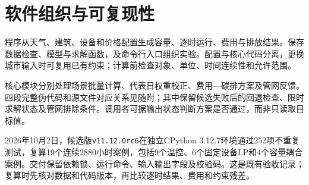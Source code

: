 \section{软件组织与可复现性}

程序从天气、建筑、设备和价格配置生成容量、逐时运行、费用与排放结果。保存数据检查、模型与求解函数，及命令行入口组织实验。配置与核心代码分离，更换城市输入时可复用已有约束；计算前检查对象、单位、时间连续性和允许范围。

核心模块分别处理场景批量计算、代表日权重校正、费用—碳排方案及管网反馈。四段完整伪代码和源文件对应关系见随附；其中保留候选失败后的回退检查、限时求解状态及管网排除条件。调用者可据输出状态判断方案是否通过，而非只读取目标值。

2026年10月2日，候选版\texttt{v11.12.0rc6}在独立CPython 3.12.7环境通过252项不重复测试，复算19个连续2880小时案例，包括9个温控、6个固定设备LP和4个容量耦合案例。交付保留依赖锁、运行命令、输入输出字段及校验码。这是既有验收记录；复算时先核对数据和代码版本，再比较逐时结果、费用和约束残差。
